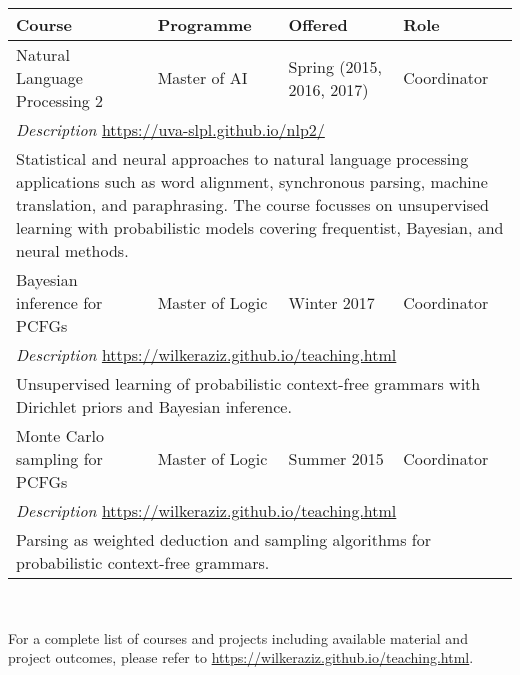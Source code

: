 \begin{tabular}{l l l l }
\bf Course & \bf Programme & \bf Offered & \bf Role \\ \hline
Natural Language Processing 2 & Master of AI & Spring (2015, 2016, 2017) & Coordinator \\
\multicolumn{4}{l}{\emph{Description} \hfill \url{https://uva-slpl.github.io/nlp2/}}\\
\multicolumn{4}{p{\textwidth}}{Statistical and neural approaches to natural language processing applications such as word alignment, synchronous parsing, machine translation, and paraphrasing. The course focusses on unsupervised learning with probabilistic models covering frequentist, Bayesian, and neural methods.} \\ \hline
Bayesian inference for PCFGs & Master of Logic & Winter 2017 & Coordinator \\
\multicolumn{4}{l}{\emph{Description} \hfill \url{https://wilkeraziz.github.io/teaching.html}}\\
\multicolumn{4}{p{\textwidth}}{Unsupervised learning of probabilistic context-free grammars with Dirichlet priors and Bayesian inference.} \\  \hline
Monte Carlo sampling for PCFGs & Master of Logic & Summer 2015 & Coordinator \\
\multicolumn{4}{l}{\emph{Description} \hfill \url{https://wilkeraziz.github.io/teaching.html}}\\
\multicolumn{4}{p{\textwidth}}{Parsing as weighted deduction and sampling algorithms for probabilistic context-free grammars.} \\ \hline
\end{tabular}

~

For a complete list of courses and projects including available material and project outcomes, please refer to \url{https://wilkeraziz.github.io/teaching.html}.




